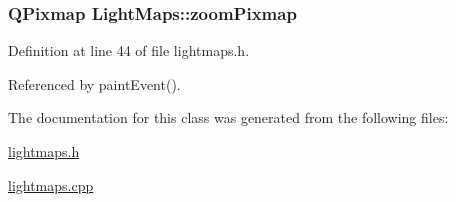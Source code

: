 \hypertarget{classLightMaps_a5a3f56996f498669ecd48b2670c3937f}{
\subsubsection[{zoom\-Pixmap}]{\setlength{\rightskip}{0pt plus 5cm}Q\-Pixmap Light\-Maps\-::zoom\-Pixmap\hspace{0.3cm}{\ttfamily [private]}}}\label{classLightMaps_a5a3f56996f498669ecd48b2670c3937f}


Definition at line 44 of file lightmaps.\-h.



Referenced by paint\-Event().



The documentation for this class was generated from the following files\-:\begin{DoxyCompactItemize}
\item 
\hyperlink{lightmaps_8h}{lightmaps.\-h}\item 
\hyperlink{lightmaps_8cpp}{lightmaps.\-cpp}\end{DoxyCompactItemize}
